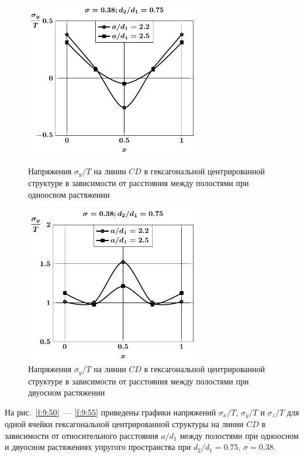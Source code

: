 \begin{figure}[h!]
\centering\footnotesize
\parbox[b]{7.5cm}{\centering\includegraphics[width=7.5cm]{cav13-a-d75-t1-sig_y-cd.pdf}
\caption{Напряжения $\sigma_y/T$ на линии $CD$ в гексагональной центрированной структуре в зависимости от расстояния между полостями при одноосном растяжении 
\label{f:9:52}}}\hfil\hfil
\parbox[b]{7.5cm}{\centering\includegraphics[width=7.5cm]{cav13-a-d75-t2-sig_y-cd.pdf}
\caption{Напряжения $\sigma_y/T$ на линии $CD$ в гексагональной центрированной структуре в зависимости от расстояния между полостями при двуосном растяжении
\label{f:9:53}}}
\end{figure}

На рис.~\ref{f:9:50}~--- \ref{f:9:55} приведены графики напряжений $\sigma_x/T$, $\sigma_y/T$ и $\sigma_z/T$ для одной ячейки гексагональной центрированной структуры на линии $CD$ в зависимости от относительного расстояния $a/d_1$ между полостями при одноосном и двуосном растяжениях упругого пространства при $d_2/d_1=0.75$, $\sigma=0.38$.

